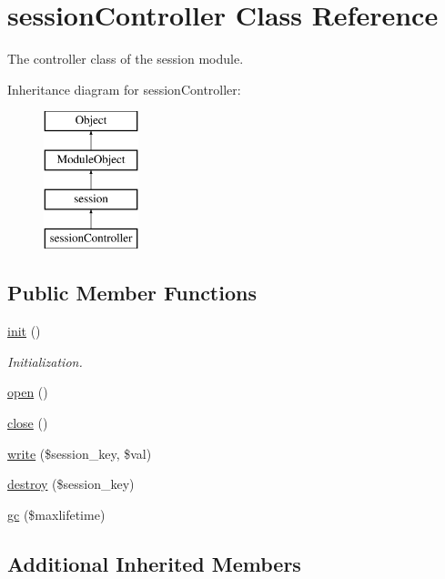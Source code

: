 \hypertarget{classsessionController}{}\section{session\+Controller Class Reference}
\label{classsessionController}


The controller class of the session module.  


Inheritance diagram for session\+Controller\+:\begin{figure}[H]
\begin{center}
\leavevmode
\includegraphics[height=4.000000cm]{classsessionController}
\end{center}
\end{figure}
\subsection*{Public Member Functions}
\begin{DoxyCompactItemize}
\item 
\hyperlink{classsessionController_a36dc0e81503442a6f77d7d96ab7b5eba}{init} ()
\begin{DoxyCompactList}\small\item\em Initialization. \end{DoxyCompactList}\item 
\hyperlink{classsessionController_a6d695e575646db3c90300eb6da7eb69d}{open} ()
\item 
\hyperlink{classsessionController_af48b21176f7a2d12c859bb8421e04f82}{close} ()
\item 
\hyperlink{classsessionController_a05f09c961d684c81c6b192fff5005407}{write} (\$session\+\_\+key, \$val)
\item 
\hyperlink{classsessionController_a695f52cca73bf4fc0efb1d35a79023c6}{destroy} (\$session\+\_\+key)
\item 
\hyperlink{classsessionController_a38ec9eb8d466cbf0191b35f69cd2f960}{gc} (\$maxlifetime)
\end{DoxyCompactItemize}
\subsection*{Additional Inherited Members}


